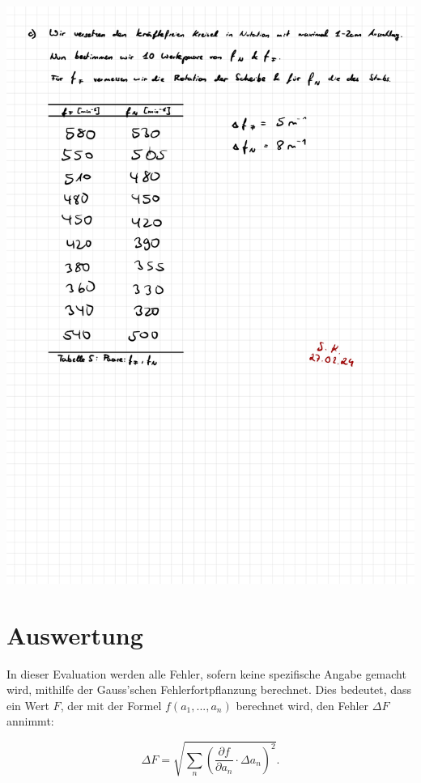 \documentclass{article}
\begin{document}
\includegraphics[width=\textwidth]{graphics/mess6.jpg}
\newpage

\addtocounter{table}{5}

\newpage
\section{Auswertung}

In dieser Evaluation werden alle Fehler, sofern keine spezifische Angabe gemacht wird, mithilfe der Gauss'schen Fehlerfortpflanzung berechnet. Dies bedeutet, dass ein Wert $F$, der mit der Formel $f(a_1, ..., a_n)$ berechnet wird, den Fehler $\Delta F$ annimmt:

\begin{equation}
    \Delta F = \sqrt{\sum_n \left( \frac{\partial f}{\partial a_n} \cdot \Delta a_n \right)^2}.
\end{equation}
\end{document}
